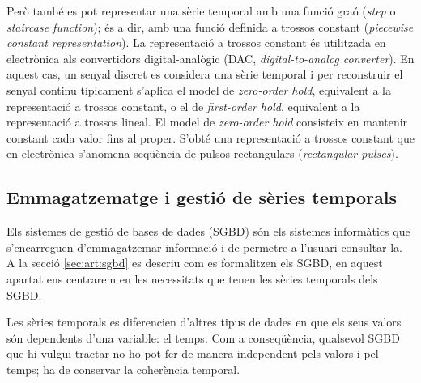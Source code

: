 Però també es pot representar una sèrie temporal amb una funció graó (\emph{step} o \emph{staircase function}); és a dir, amb una funció definida a trossos constant (\emph{piecewise constant representation}).
La representació a trossos constant és utilitzada en electrònica als convertidors digital-analògic (DAC, \emph{digital-to-analog converter}). En aquest cas, un senyal discret es considera una sèrie temporal i per reconstruir el senyal continu típicament s'aplica el model de \emph{zero-order hold}, equivalent a la representació a trossos constant,  o el de \emph{first-order hold},  equivalent a la representació a trossos lineal.
El model de \emph{zero-order hold} consisteix en mantenir constant cada valor fins al proper. S'obté una representació a trossos constant que en electrònica s'anomena seqüència de pulsos rectangulars (\emph{rectangular pulses}).










\subsection{Emmagatzematge i gestió de sèries temporals}


Els sistemes de gestió de bases de dades (SGBD) són els sistemes informàtics que s'encarreguen d'emmagatzemar informació i de permetre a l'usuari consultar-la. A la secció \ref{sec:art:sgbd} es descriu com es formalitzen els SGBD, en aquest apartat ens centrarem en les necessitats que tenen les sèries temporals dels SGBD.


Les sèries temporals es diferencien d'altres tipus de dades en que els seus valors són dependents d'una variable: el temps. Com a conseqüència, qualsevol SGBD que hi vulgui tractar no ho pot fer de manera independent pels valors i pel temps; ha de conservar la coherència temporal.

